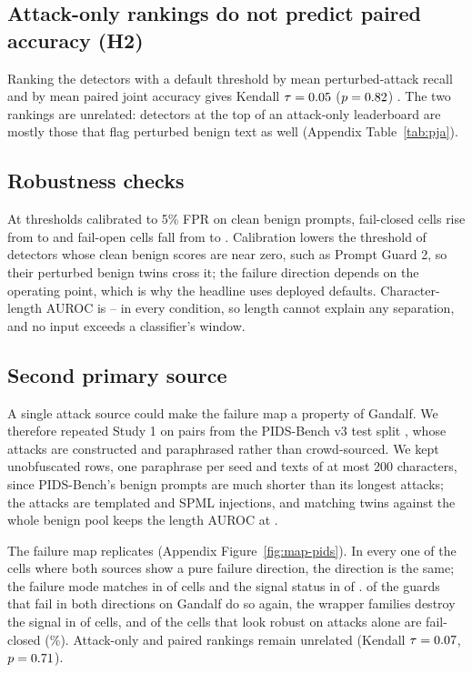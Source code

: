 \documentclass[conference]{IEEEtran}
\begin{document}
\subsection{Attack-only rankings do not predict paired accuracy (H2)}

Ranking the \hTwoN{} detectors with a default threshold by mean perturbed-attack recall and by mean paired joint accuracy gives Kendall $\tau = 0.05$ ($p = 0.82$) \citep{kendall1938}. The two rankings are unrelated: detectors at the top of an attack-only leaderboard are mostly those that flag perturbed benign text as well (Appendix Table~\ref{tab:pja}).

\subsection{Robustness checks}

At thresholds calibrated to 5\% FPR on clean benign prompts, fail-closed cells rise from \nModeClosed{} to \nModeFprClosed{} and fail-open cells fall from \nModeOpen{} to \nModeFprOpen{}. Calibration lowers the threshold of detectors whose clean benign scores are near zero, such as Prompt Guard 2, so their perturbed benign twins cross it; the failure direction depends on the operating point, which is why the headline uses deployed defaults. Character-length AUROC is \lengthAucMin--\lengthAucMax{} in every condition, so length cannot explain any separation, and no input exceeds a classifier's window.

\subsection{Second primary source}
\label{sec:second}
A single attack source could make the failure map a property of Gandalf. We therefore repeated Study 1 on \pidsPairs{} pairs from the PIDS-Bench v3 test split \citep{pidsbench2026}, whose attacks are constructed and paraphrased rather than crowd-sourced. We kept unobfuscated rows, one paraphrase per seed and texts of at most 200 characters, since PIDS-Bench's benign prompts are much shorter than its longest attacks; the attacks are \pidsTemplateAttacks{} templated and \pidsSpmlAttacks{} SPML injections, and matching twins against the whole benign pool keeps the length AUROC at \pidsLengthAuc{}.

The failure map replicates (Appendix Figure~\ref{fig:map-pids}). In every one of the \replDirCells{} cells where both sources show a pure failure direction, the direction is the same; the failure mode matches in \replModeSame{} of \replModeCells{} cells and the signal status in \replSigSame{} of \replCells{}. \replMixedSame{} of the \nMixedGuards{} guards that fail in both directions on Gandalf do so again, the wrapper families destroy the signal in \pidsWrapDestroyed{} of \pidsWrapCells{} cells, and \pidsAttackRobustFC{} of the \pidsAttackRobust{} cells that look robust on attacks alone are fail-closed (\pidsPctAttackRobustFC\%). Attack-only and paired rankings remain unrelated (Kendall $\tau = 0.07$, $p = 0.71$).
\end{document}
